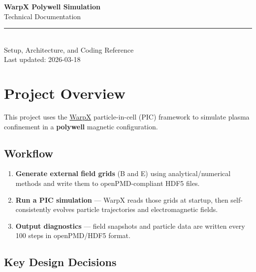 \documentclass[11pt, a4paper]{article}
\begin{document}
\begin{titlepage}
    \centering
    \vspace*{3cm}
    {\Huge\bfseries\sffamily WarpX Polywell Simulation\\[0.4em]}
    {\Large\sffamily Technical Documentation\\[2em]}
    \rule{0.6\linewidth}{0.6pt}\\[1.5em]
    {\large Setup, Architecture, and Coding Reference}\\[3em]
    {\normalsize Last updated: 2026-03-18}
    \vfill
\end{titlepage}

\tableofcontents
\newpage

\section{Project Overview}

This project uses the \href{https://ecp-warpx.github.io/}{WarpX} particle-in-cell (PIC)
framework to simulate plasma confinement in a \textbf{polywell} magnetic configuration.

\subsection*{Workflow}
\begin{enumerate}
    \item \textbf{Generate external field grids} (B and E) using analytical/numerical
          methods and write them to openPMD-compliant HDF5 files.
    \item \textbf{Run a PIC simulation} — WarpX reads those grids at startup, then
          self-consistently evolves particle trajectories and electromagnetic fields.
    \item \textbf{Output diagnostics} — field snapshots and particle data are written
          every 100 steps in openPMD/HDF5 format.
\end{enumerate}

\subsection*{Key Design Decisions}
\end{document}
